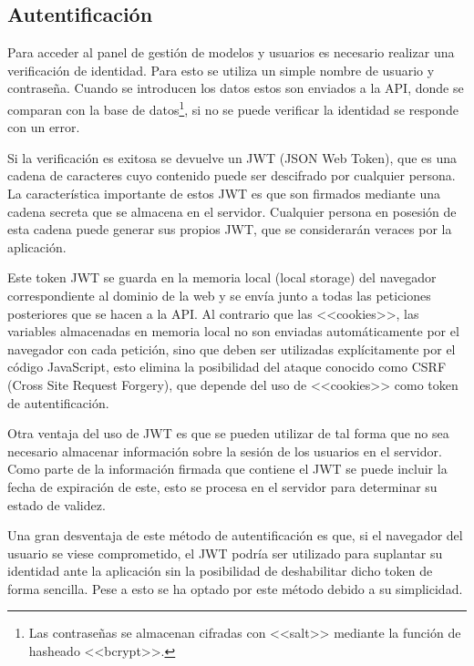 \subsection{Autentificación}

Para acceder al panel de gestión de modelos y usuarios es necesario realizar una
verificación de identidad. Para esto se utiliza un simple nombre de usuario y
contraseña. Cuando se introducen los datos estos son enviados a la API, donde se
comparan con la base de datos\footnote{Las contraseñas se almacenan cifradas con
<<salt>> mediante la función de hasheado <<bcrypt>>.}, si no se puede verificar
la identidad se responde con un error.

Si la verificación es exitosa se devuelve un JWT (JSON Web Token), que es una
cadena de caracteres cuyo contenido puede ser descifrado por cualquier persona.
La característica importante de estos JWT es que son firmados mediante una
cadena secreta que se almacena en el servidor. Cualquier persona en posesión de
esta cadena puede generar sus propios JWT, que se considerarán veraces por la
aplicación.

Este token JWT se guarda en la memoria local (local storage) del navegador
correspondiente al dominio de la web y se envía junto a todas las peticiones
posteriores que se hacen a la API. Al contrario que las <<cookies>>, las
variables almacenadas en memoria local no son enviadas automáticamente por el
navegador con cada petición, sino que deben ser utilizadas explícitamente por el
código JavaScript, esto elimina la posibilidad del ataque conocido como CSRF
(Cross Site Request Forgery), que depende del uso de <<cookies>> como token de
autentificación.

Otra ventaja del uso de JWT es que se pueden utilizar de tal forma que no sea
necesario almacenar información sobre la sesión de los usuarios en el servidor.
Como parte de la información firmada que contiene el JWT se puede incluir la
fecha de expiración de este, esto se procesa en el servidor para determinar su
estado de validez.

Una gran desventaja de este método de autentificación es que, si el navegador
del usuario se viese comprometido, el JWT podría ser utilizado para suplantar su
identidad ante la aplicación sin la posibilidad de deshabilitar dicho token de
forma sencilla. Pese a esto se ha optado por este método debido a su simplicidad.
